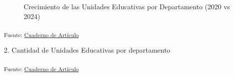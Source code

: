\documentclass[
  12pt]{article}
\begin{document}
\begin{figure}[H]


\caption{\label{fig-crec2024}Crecimiento de las Unidades Educativas por
Departamento (2020 vs 2024)}

\end{figure}%

\textsubscript{Fuente:
\href{https://sociest.github.io/ue-report/index.ipynb.html}{Cuaderno de
Artículo}}

2. Cantidad de Unidades Educativas por departamento

\textsubscript{Fuente:
\href{https://sociest.github.io/ue-report/index.ipynb.html}{Cuaderno de
Artículo}}
\end{document}
